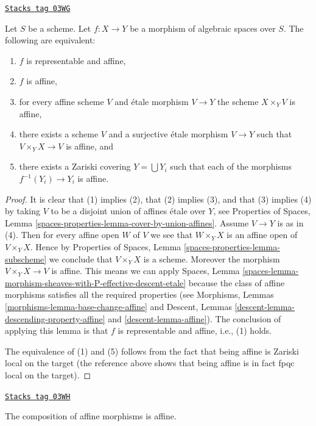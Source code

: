 \begin{lemma}
\label{spaces-morphisms-lemma-affine-local}
\href{https://stacks.math.columbia.edu/tag/03WG}{\texttt{Stacks tag 03WG}}

Let $S$ be a scheme.
Let $f : X \to Y$ be a morphism of algebraic spaces over $S$.
The following are equivalent:
\begin{enumerate}
\item $f$ is representable and affine,
\item $f$ is affine,
\item for every affine scheme $V$ and \'etale morphism $V \to Y$
the scheme $X \times_Y V$ is affine,
\item there exists a scheme $V$ and a surjective \'etale morphism
$V \to Y$ such that $V \times_Y X \to V$ is affine, and
\item there exists a Zariski covering $Y = \bigcup Y_i$ such
that each of the morphisms $f^{-1}(Y_i) \to Y_i$ is affine.
\end{enumerate}
\end{lemma}

\begin{proof}
It is clear that (1) implies (2), that (2) implies (3), and that
(3) implies (4) by taking $V$ to be a disjoint union of affines
\'etale over $Y$, see Properties of Spaces,
Lemma \ref{spaces-properties-lemma-cover-by-union-affines}.
Assume $V \to Y$ is as in (4). Then for every affine open $W$ of $V$ we see
that $W \times_Y X$ is an affine open of $V \times_Y X$. Hence by
Properties of Spaces, Lemma \ref{spaces-properties-lemma-subscheme}
we conclude that $V \times_Y X$ is a scheme. Moreover the morphism
$V \times_Y X \to V$ is affine. This means we can apply
Spaces,
Lemma \ref{spaces-lemma-morphism-sheaves-with-P-effective-descent-etale}
because the class of affine morphisms satisfies all the required
properties (see
Morphisms, Lemmas \ref{morphisms-lemma-base-change-affine} and
Descent, Lemmas \ref{descent-lemma-descending-property-affine}
and \ref{descent-lemma-affine}). The conclusion of applying this lemma
is that $f$ is representable and affine, i.e., (1) holds.

\medskip\noindent
The equivalence of (1) and (5) follows from the fact that being
affine is Zariski local on the target (the reference above shows
that being affine is in fact fpqc local on the target).
\end{proof}

\begin{lemma}
\label{spaces-morphisms-lemma-composition-affine}
\href{https://stacks.math.columbia.edu/tag/03WH}{\texttt{Stacks tag 03WH}}

The composition of affine morphisms is affine.
\end{lemma}

